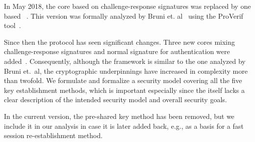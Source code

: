 \documentclass[runningheads, envcountsame, hidelinks, a4paper, draft, x11names]{llncs}
\begin{document}
In May 2018, the core based on challenge-response signatures was replaced by
one based \mSigma{}~\cite{bruni-analysis-selander-ace-cose-ecdhe-08}.
%
This version was formally analyzed by Bruni et.
al~\cite{DBLP:conf/secsr/BruniJPS18} using the ProVerif
tool~\cite{DBLP:conf/csfw/Blanchet01}.
%

Since then the protocol has seen significant changes.
%
Three new cores mixing challenge-response signatures and normal signature for
authentication were added~\cite{our-analysis-selander-lake-edhoc-01}.
%
Consequently, although the framework is similar to the one analyzed by Bruni
et.~al, the cryptographic underpinnings have increased in complexity more than
twofold.
%
We formulate and formalize a security model covering all the five key
establishment methods, which is important especially since the \mSpec{} itself
lacks a clear description of the intended security model and overall security
goals.
%

In the current version, the pre-shared key method has been removed, but we
include it in our analysis in case it is later added back, e.g., as a basis for
a fast session re-establishment method.
%

%
%
%
\end{document}
